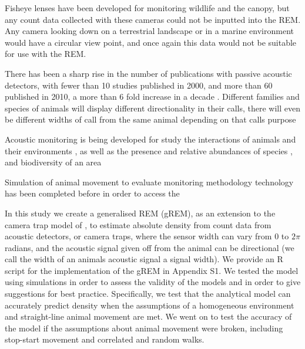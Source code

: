 Fisheye lenses have been developed for monitoring wildlife and the canopy, but any count data collected with these cameras could not be inputted into the REM. 
Any camera looking down on a terrestrial landscape or in a marine environment would have a circular view point, and once again this data would not be suitable for use with the REM. 

There has been a sharp rise in the number of publications with passive acoustic detectors, with fewer than 10 studies published in 2000, and more than 60 published in 2010, a more than 6 fold increase in a decade \citep{kessel2014review}. 
Different families and species of animals will display different directionality in their calls, there will even be different widths of call from the same animal depending on that calls purpose \citep{jakobsen2012convergent}

Acoustic monitoring is being developed for study the interactions of animals and their environments \citep{blumstein2011acoustic, straight2014passive, marcoux2011local, rogers2013density}, as well as the presence and relative abundances of species \citep{mckown2012wireless, marcoux2011local}, and biodiversity of an area \citep{ depraetere2012monitoring}

Simulation of animal movement to evaluate monitoring methodology technology has been completed before \citep{ivan2013using, rees2011testing} in order to access the 

In this study we create a generalised REM (gREM), as an extension to the camera trap model of \citep{rowcliffe2008estimating}, to estimate absolute density from count data from acoustic detectors, or camera traps, where the sensor width can vary from 0 to $2\pi$ radians, and the acoustic signal given off from the animal can be directional (we call the width of an animals acoustic signal a signal width). 
We provide an R \citep{R} script for the implementation of the gREM in Appendix S1.  
 We tested the model using simulations in order to assess the validity of the models and in order to give suggestions for best practice. Specifically, we test that the analytical model can accurately predict density when the assumptions of a homogeneous environment and straight-line animal movement are met. We went on to test the accuracy of the model if the assumptions about animal movement were broken, including stop-start movement and correlated and random walks.
